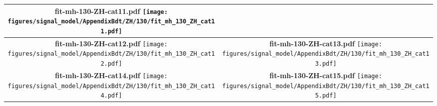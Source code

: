 \begin{longtable}{|c|c|}
{\centering
{\bfseries fit-mh-130-ZH-cat11.pdf}
\texttt{[image: figures/signal\_model/AppendixBdt/ZH/130/fit\_mh\_130\_ZH\_cat11.pdf]}
}
 \\
\hline
\parbox{0.47\textwidth}{
\centering
{\bfseries fit-mh-130-ZH-cat12.pdf}
\texttt{[image: figures/signal\_model/AppendixBdt/ZH/130/fit\_mh\_130\_ZH\_cat12.pdf]}
}
 & \parbox{0.47\textwidth}{
\centering
{\bfseries fit-mh-130-ZH-cat13.pdf}
\texttt{[image: figures/signal\_model/AppendixBdt/ZH/130/fit\_mh\_130\_ZH\_cat13.pdf]}
}
 \\
\hline
\parbox{0.47\textwidth}{
\centering
{\bfseries fit-mh-130-ZH-cat14.pdf}
\texttt{[image: figures/signal\_model/AppendixBdt/ZH/130/fit\_mh\_130\_ZH\_cat14.pdf]}
}
 & \parbox{0.47\textwidth}{
\centering
{\bfseries fit-mh-130-ZH-cat15.pdf}
\texttt{[image: figures/signal\_model/AppendixBdt/ZH/130/fit\_mh\_130\_ZH\_cat15.pdf]}
}
 \\
\hline
\end{longtable}
